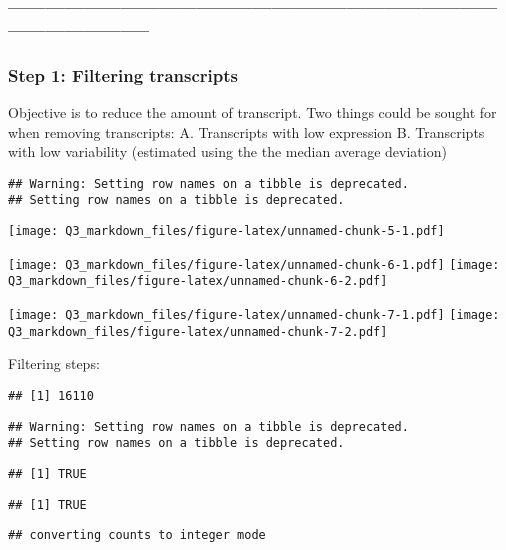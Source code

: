 \documentclass[
]{article}
\begin{document}
\hypertarget{section}{%
\subsubsection{-----------------------------------------------------------------------------------------------------}\label{section}}

\hypertarget{step-1-filtering-transcripts}{%
\subsubsection{Step 1: Filtering
transcripts}\label{step-1-filtering-transcripts}}

Objective is to reduce the amount of transcript. Two things could be
sought for when removing transcripts: A. Transcripts with low expression
B. Transcripts with low variability (estimated using the the median
average deviation)

\begin{verbatim}
## Warning: Setting row names on a tibble is deprecated.
## Setting row names on a tibble is deprecated.
\end{verbatim}

\texttt{[image: Q3\_markdown\_files/figure-latex/unnamed-chunk-5-1.pdf]}

\texttt{[image: Q3\_markdown\_files/figure-latex/unnamed-chunk-6-1.pdf]}
\texttt{[image: Q3\_markdown\_files/figure-latex/unnamed-chunk-6-2.pdf]}

\texttt{[image: Q3\_markdown\_files/figure-latex/unnamed-chunk-7-1.pdf]}
\texttt{[image: Q3\_markdown\_files/figure-latex/unnamed-chunk-7-2.pdf]}

Filtering steps:

\begin{verbatim}
## [1] 16110
\end{verbatim}

\begin{verbatim}
## Warning: Setting row names on a tibble is deprecated.
## Setting row names on a tibble is deprecated.
\end{verbatim}

\begin{verbatim}
## [1] TRUE
\end{verbatim}

\begin{verbatim}
## [1] TRUE
\end{verbatim}

\begin{verbatim}
## converting counts to integer mode
\end{verbatim}
\end{document}
